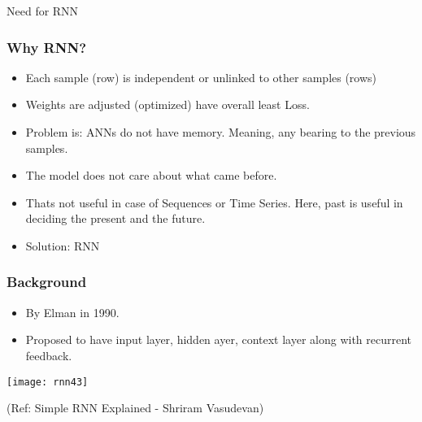 \begin{frame}
  \begin{center}
    {\Large Need for RNN}
  \end{center}
\end{frame}


\begin{frame}[fragile] \frametitle{Why RNN?}

\begin{itemize}
\item Each sample (row) is independent or unlinked to other samples (rows)
\item Weights are adjusted (optimized) have overall least Loss.
\item Problem is: ANNs do not have memory. Meaning, any bearing to the previous samples.
\item The model does not care about what came before.
\item Thats not useful in case of Sequences or Time Series. Here, past is useful in deciding the present and the future.
\item Solution: RNN
\end{itemize}


\end{frame}


\begin{frame}[fragile] \frametitle{Background}

\begin{itemize}
\item By Elman in 1990.
\item Proposed to have input layer, hidden ayer, context layer along with recurrent feedback.
\end{itemize}

\begin{center}
\texttt{[image: rnn43]}
\end{center}

{\tiny (Ref: Simple RNN Explained - Shriram Vasudevan)}

\end{frame}

